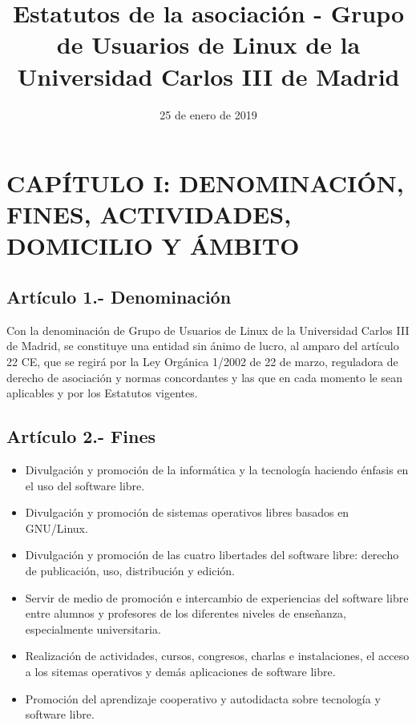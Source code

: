 \documentclass[12pt]{article}
\title{Estatutos de la asociación - Grupo de Usuarios de Linux de la Universidad Carlos III de Madrid}
\date{25 de enero de 2019}
\begin{document}
\maketitle
\thispagestyle{empty}
\newpage

\tableofcontents
\newpage


\section{CAPÍTULO I: DENOMINACIÓN, FINES, ACTIVIDADES, DOMICILIO Y ÁMBITO}


\subsection{Artículo 1.- Denominación}
Con la denominación de Grupo de Usuarios de Linux de la Universidad Carlos III de Madrid, se constituye una entidad sin ánimo de lucro, al amparo del artículo 22 CE, que se regirá por la Ley Orgánica 1/2002 de 22 de marzo, reguladora de derecho de asociación y normas concordantes y las que en cada momento le sean aplicables y por los Estatutos vigentes.

\subsection{Artículo 2.- Fines}
\begin{itemize}
    \item Divulgación y promoción de la informática y la tecnología haciendo énfasis en el uso del software libre.
    \item Divulgación y promoción de sistemas operativos libres basados en GNU/Linux.
    \item Divulgación y promoción de las cuatro libertades del software libre: derecho de publicación, uso, distribución y edición.
    \item Servir de medio de promoción e intercambio de experiencias del software libre entre alumnos y profesores de los diferentes niveles de enseñanza, especialmente universitaria.
    \item Realización de actividades, cursos, congresos, charlas e instalaciones, el acceso a los sitemas operativos y demás aplicaciones de software libre.
    \item Promoción del aprendizaje cooperativo y autodidacta sobre tecnología y software libre.
\end{itemize}
\end{document}
